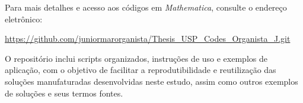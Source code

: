 Para mais detalhes e acesso aos códigos em \textit{Mathematica}, consulte o endereço eletrônico:
\begin{center}
    \url{https://github.com/juniormarorganista/Thesis_USP_Codes_Organista_J.git}
\end{center}
O repositório inclui scripts organizados, instruções de uso e exemplos de aplicação, com o objetivo de facilitar a reprodutibilidade e reutilização das soluções manufaturadas desenvolvidas neste estudo, assim como outros exemplos de soluções e seus termos fontes.